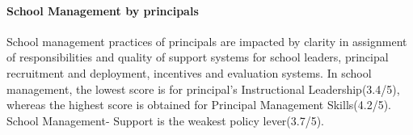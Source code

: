 \documentclass[
]{article}
\begin{document}
\hypertarget{school-management-by-principals}{%
\paragraph{\texorpdfstring{\textbf{School Management by
principals}}{School Management by principals}}\label{school-management-by-principals}}

School management practices of principals are impacted by clarity in
assignment of responsibilities and quality of support systems for school
leaders, principal recruitment and deployment, incentives and evaluation
systems. In school management, the lowest score is for principal's
Instructional Leadership(3.4/5), whereas the highest score is obtained
for Principal Management Skills(4.2/5). School Management- Support is
the weakest policy lever(3.7/5).
\end{document}
